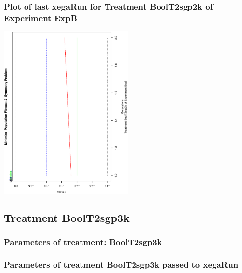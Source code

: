 \documentclass[18pt,c]{beamer}
\makeatletter
\def\beamer@writeslidentry@miniframesoff{%
  \expandafter\beamer@ifempty\expandafter{\beamer@framestartpage}{}%
  {%
   \clearpage\beamer@notesactions%
  }
}
\newcommand*{\miniframesoff}{\let\beamer@writeslidentry=\beamer@writeslidentry@miniframesoff}
\makeatother
\begin{document}
 \begin{frame}
 \frametitle{ Plot of last xegaRun for Treatment BoolT2sgp2k of Experiment ExpB }
 \begin{center}
\includegraphics[width=0.5\textwidth, angle=-90]
{ExpBPlotPopStatsFigure010.eps}
 \end{center}
 \label{report/ExpBPlotPopStatsFigure010.eps}  
 \end{frame}

\miniframesoff
\subsection{Treatment BoolT2sgp3k}

 \begin{frame}
 \fontsize{8pt}{9pt}\selectfont
 \frametitle{  Parameters of treatment: BoolT2sgp3k 
 }

 \label{ExpBtParmTable044.tex}  
 \end{frame}


 \begin{frame}
 \fontsize{8pt}{9pt}\selectfont
 \frametitle{  Parameters of treatment BoolT2sgp3k passed to xegaRun
 }

 \label{ExpBtParmTable045.tex}  
 \end{frame}
\end{document}
